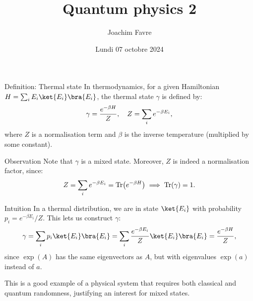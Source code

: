 \documentclass[a4paper]{article}
\title{Quantum physics 2}
\author{Joachim Favre}
\date{Lundi 07 octobre 2024}
\begin{document}
\maketitle


\begin{parag}{Definition: Thermal state}
    In thermodynamics, for a given Hamiltonian $H = \sum_{i} E_i \ket{E_i}\bra{E_i}$, the thermal state $\gamma$ is defined by: 
    \[\gamma = \frac{e^{- \beta H}}{Z}, \quad Z = \sum_{i} e^{- \beta E_i},\]
    where $Z$ is a normalisation term and $\beta$ is the inverse temperature (multiplied by some constant).

    \begin{subparag}{Observation}
        Note that $\gamma$ is a mixed state. Moreover, $Z$ is indeed a normalisation factor, since: 
        \[Z = \sum_{i} e^{- \beta E_i} = \Tr\left(e^{-\beta H}\right) \implies \Tr\left(\gamma\right) = 1.\]
    \end{subparag}
   
    \begin{subparag}{Intuition}
        In a thermal distribution, we are in state $\ket{E_i}$ with probability $p_i = e^{- \beta E_i} / Z$. This lets us construct $\gamma$: 
        \[\gamma = \sum_{i} p_i \ket{E_i}\bra{E_i} = \sum_{i} \frac{e^{- \beta E_i}}{Z} \ket{E_i}\bra{E_i} = \frac{e^{-\beta H}}{Z},\]
        since $\exp\left(A\right)$ has the same eigenvectors as $A$, but with eigenvalues $\exp\left(a\right)$ instead of $a$.

        This is a good example of a physical system that requires both classical and quantum randomness, justifying an interest for mixed states.
    \end{subparag}
\end{parag}
\end{document}
